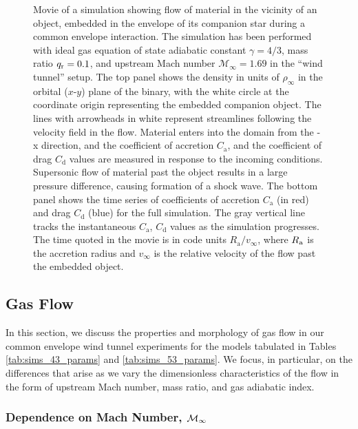\begin{figure}[t]
 \caption{Movie of a simulation showing flow of material in the vicinity of an object, embedded in the envelope of its companion star during a common envelope interaction. The simulation has been performed with ideal gas equation of state adiabatic constant $\gamma = 4/3$, mass ratio $q_{\rm r} = 0.1$, and upstream Mach number $\mathcal{M}_\infty = 1.69$ in the ``wind tunnel'' setup. The top panel shows the density in units of $\rho_\infty$ in the orbital ($x$-$y$) plane of the binary, with the white circle at the coordinate origin representing the embedded companion object. The lines with arrowheads in white represent streamlines following the velocity field in the flow. Material enters into the domain from the -x direction, and the coefficient of accretion $C_{\mathrm a}$, and the coefficient of drag $C_{\mathrm d}$ values are measured in response to the incoming conditions. Supersonic flow of material past the object results in a large pressure difference, causing formation of a shock wave. The bottom panel shows the time series of coefficients of accretion $C_{\mathrm a}$ (in red) and drag $C_{\mathrm d}$ (blue) for the full simulation. The gray vertical line tracks the instantaneous $C_{\mathrm a}$, $C_{\mathrm d}$ values as the simulation progresses. The time quoted in the movie is in code units $R_{\mathrm{a}}/v_\infty$, where $R_{\rm a}$ is the accretion radius and $v_\infty$ is the relative velocity of the flow past the embedded object. \label{fig:video_sim}}  %
\vspace*{5mm}
\end{figure}

\vspace*{2.5mm}
\subsection{Gas Flow}\label{sec:hydro}
In this section, we discuss the properties and morphology of gas flow in our common envelope wind tunnel experiments for the models tabulated in Tables \ref{tab:sims_43_params} and \ref{tab:sims_53_params}. We focus, in particular, on the differences that arise as we vary the dimensionless characteristics of the flow in the form of upstream Mach number, mass ratio, and gas adiabatic index. 

\subsubsection{Dependence on Mach Number, ${\cal M}_\infty$}\label{sec:hydro_mach}

